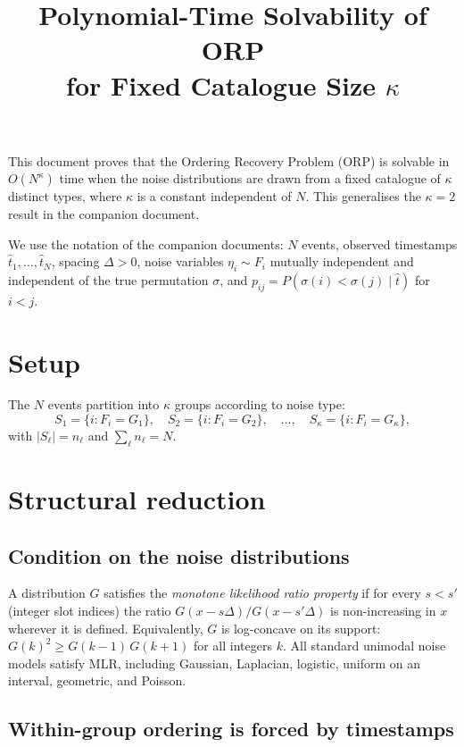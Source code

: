 \documentclass[11pt]{article}
\title{Polynomial-Time Solvability of ORP\\for Fixed Catalogue Size $\kappa$}
\date{}
\begin{document}
\maketitle

\noindent This document proves that the Ordering Recovery Problem (ORP) is solvable in
$O(N^\kappa)$ time when the noise distributions are drawn from a fixed catalogue of
$\kappa$ distinct types, where $\kappa$ is a constant independent of $N$.  This
generalises the $\kappa = 2$ result in the companion document.

We use the notation of the companion documents: $N$ events, observed timestamps
$\hat{t}_1, \ldots, \hat{t}_N$, spacing $\Delta > 0$, noise variables
$\eta_i \sim F_i$ mutually independent and independent of the true permutation
$\sigma$, and $p_{ij} = P(\sigma(i) < \sigma(j) \mid \hat{t})$ for $i < j$.

\section{Setup}

The $N$ events partition into $\kappa$ groups according to noise type:
\[
  S_1 = \{i : F_i = G_1\},\quad S_2 = \{i : F_i = G_2\},\quad \ldots,\quad
  S_\kappa = \{i : F_i = G_\kappa\},
\]
with $|S_\ell| = n_\ell$ and $\sum_\ell n_\ell = N$.

\section{Structural reduction}

\subsection{Condition on the noise distributions}

\begin{definition}
A distribution $G$ satisfies the \emph{monotone likelihood ratio property} if for
every $s < s'$ (integer slot indices) the ratio $G(x - s\Delta)/G(x - s'\Delta)$ is
non-increasing in $x$ wherever it is defined.  Equivalently, $G$ is log-concave on
its support: $G(k)^2 \ge G(k-1)\,G(k+1)$ for all integers $k$.  All standard
unimodal noise models satisfy MLR, including Gaussian, Laplacian, logistic, uniform
on an interval, geometric, and Poisson.
\end{definition}

\subsection{Within-group ordering is forced by timestamps}
\end{document}
